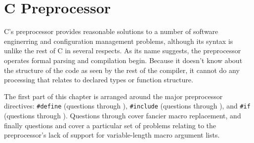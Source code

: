\chapter{C Preprocessor}	\label{chap:preproc}

C's preprocessor provides reasonable solutions to a number of software
enginerring and configuration management problems, although its syntax is
unlike the rest of C in several respects. As its name suggests, the
preprocessor operates  formal parsing and compilation begin.
Because it doesn't know about the structure of the code as seen by the rest of
the compiler, it cannot do any processing that relates to declared types or
function structure.

The first part of this chapter is arranged around the major preprocessor
directives: \verb+#define+ (questions  through ), \verb+#include+
(questions  through ), and \verb+#if+
(questions  through ). Questions
 through  cover fancier macro replacement, and finally questions
 and  cover a particular set of problems relating to the
preprocessor's lack of support for variable-length macro argument lists.

